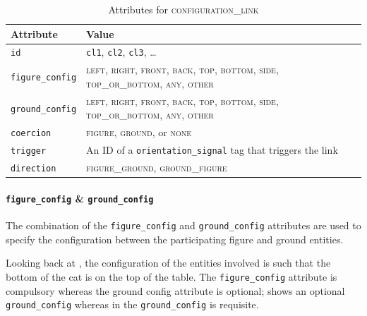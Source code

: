 \documentclass[11pt]{article}
\newenvironment{attributes}
{
\begin{tabular}{|l|l|}
    \hline \textbf{Attribute} & \textbf{Value}\\
}
{   \hline
\end{tabular}
}
\begin{document}
\begin{table}[h]
\centering
\begin{attributes}
    \hline \texttt{id}                  & \texttt{cl1}, \texttt{cl2}, 
                                          \texttt{cl3}, \ldots\\
    \hline \texttt{figure\_config}      & \textsc{left}, \textsc{right}, \textsc{front}, \textsc{back}, \textsc{top}, \textsc{bottom}, \textsc{side}, \textsc{top\_or\_bottom}, \textsc{any}, \textsc{other}\\
    \hline \texttt{ground\_config}      & \textsc{left}, \textsc{right}, \textsc{front}, \textsc{back}, \textsc{top}, \textsc{bottom}, \textsc{side}, \textsc{top\_or\_bottom}, \textsc{any}, \textsc{other}\\
    \hline \texttt{coercion}            & \textsc{figure}, \textsc{ground}, or \textsc{none}\\
    \hline \texttt{trigger}             & An ID of a \texttt{orientation\_signal} tag that triggers the link\\
    \hline \texttt{direction}           & \textsc{figure\_ground}, \textsc{ground\_figure}\\
\end{attributes}
\caption{Attributes for \textsc{configuration\_link}}
\label{tab:configuration_link}
\end{table}


\paragraph{\texttt{figure\_config} \& \texttt{ground\_config}} %
\label{par:figure_ground_config}
The combination of the \texttt{figure\_config} and \texttt{ground\_config} attributes are used to specify the configuration between the participating figure and ground entities. 

\iffalse
Looking back at , the configuration of the entities involved is such that the bottom of the cat is on the top of the table. The \texttt{figure\_config} attribute is compulsory whereas the ground config attribute is optional;  shows an optional \texttt{ground\_config} whereas in  the \texttt{ground\_config} is requisite.
\end{document}
